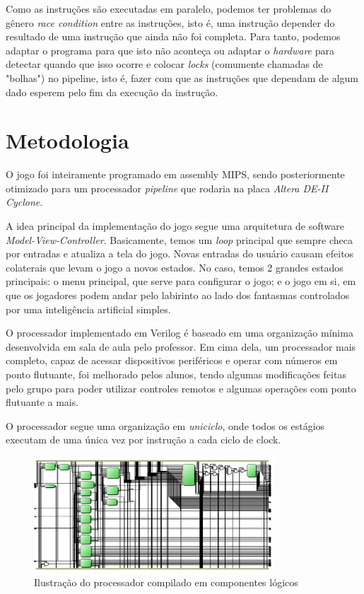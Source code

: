 \documentclass[12pt, a4paper, twocolumn]{article}
\begin{document}
Como as instruções são executadas em paralelo, podemos ter problemas do gênero \textit{race condition} entre as instruções, isto é, uma instrução depender do resultado de uma instrução que ainda não foi completa. Para tanto, podemos adaptar o programa para que isto não aconteça ou adaptar o \textit{hardware} para detectar quando que isso ocorre e colocar \textit{locks} (comumente chamadas de "bolhas") no pipeline, isto é, fazer com que as instruções que dependam de algum dado esperem pelo fim da execução da instrução.


\section{Metodologia}

O jogo foi inteiramente programado em assembly MIPS, sendo posteriormente otimizado para um processador \textit{pipeline} que rodaria na placa \textit{Altera DE-II Cyclone}.

A idea principal da implementação do jogo segue uma arquitetura de software \textit{Model-View-Controller}. Basicamente, temos um \textit{loop} principal que sempre checa por entradas e atualiza a tela do jogo. Novas entradas do usuário causam efeitos colaterais que levam o jogo a novos estados. No caso, temos 2 grandes estados principais: o menu principal, que serve para configurar o jogo; e o jogo em si, em que os jogadores podem andar pelo labirinto ao lado dos fantasmas controlados por uma inteligência artificial simples.

O processador implementado em Verilog é baseado em uma organização mínima desenvolvida em sala de aula pelo professor. Em cima dela, um processador mais completo, capaz de acessar dispositivos periféricos e operar com números em ponto flutuante, foi melhorado pelos alunos, tendo algumas modificações feitas pelo grupo para poder utilizar controles remotos e algumas operações com ponto flutuante a mais.

O processador segue uma organização em \textit{uniciclo}, onde todos os estágios executam de uma única vez por instrução a cada ciclo de clock.

\begin{figure}[h!]
    \centering
    \includegraphics[width=0.8\textwidth]{data_unicicle.png}
    \caption{Ilustração do processador compilado em componentes lógicos}
\end{figure}
\end{document}
